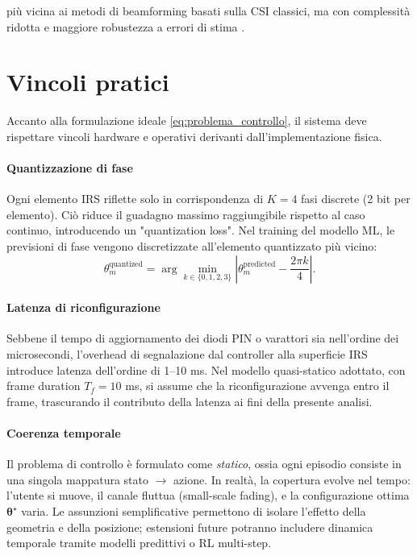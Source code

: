 \documentclass[12pt,a4paper]{report}
\begin{document}
più vicina ai metodi di beamforming basati sulla CSI classici, ma con
complessità ridotta e maggiore robustezza a errori di stima
\cite{guo2021cascaded}.

\section{Vincoli pratici}
Accanto alla formulazione ideale \eqref{eq:problema_controllo}, il
sistema deve rispettare vincoli hardware e operativi derivanti
dall'implementazione fisica.

\paragraph{Quantizzazione di fase}
Ogni elemento IRS riflette solo in corrispondenza di $K = 4$ fasi
discrete (2 bit per elemento). Ciò riduce il guadagno massimo
raggiungibile rispetto al caso continuo, introducendo un
"quantization loss". Nel training del modello ML, le previsioni di
fase vengono discretizzate all'elemento quantizzato più vicino:
\begin{equation}
  \theta_m^{\text{quantized}} = \arg\min_{k \in \{0, 1, 2, 3\}}
  \left| \theta_m^{\text{predicted}} - \frac{2\pi k}{4} \right|.
\end{equation}

\paragraph{Latenza di riconfigurazione}
Sebbene il tempo di aggiornamento dei diodi PIN o varattori sia
nell'ordine dei microsecondi, l'overhead di segnalazione dal
controller alla superficie IRS introduce latenza dell'ordine di 1--10
ms. Nel modello quasi-statico adottato, con frame duration $T_f = 10$
ms, si assume che la riconfigurazione avvenga entro il frame,
trascurando il contributo della latenza ai fini della presente analisi.

\paragraph{Coerenza temporale}
Il problema di controllo è formulato come \emph{statico}, ossia ogni
episodio consiste in una singola mappatura stato $\rightarrow$
azione. In realtà, la copertura evolve nel tempo: l'utente si muove,
il canale fluttua (small-scale fading), e la configurazione ottima
$\boldsymbol{\theta}^\star$ varia. Le assunzioni semplificative
permettono di isolare l'effetto della geometria e della posizione;
estensioni future potranno includere dinamica temporale tramite
modelli predittivi o RL multi-step.
\end{document}
